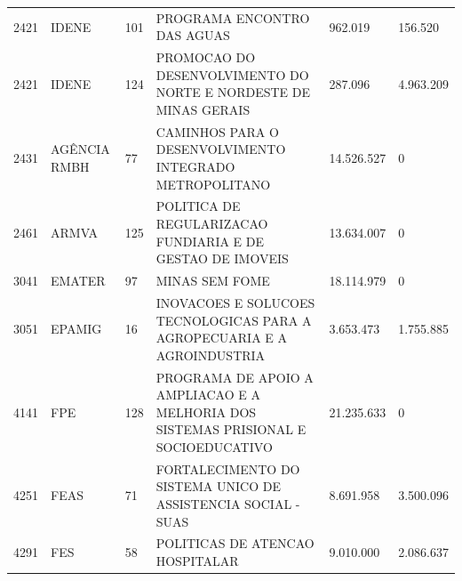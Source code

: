 \documentclass{article}
\begin{document}
\begin{longtable}[c]{m{1cm}|m{1.5cm}|m{1cm}m{8cm}|m{2cm}m{2cm}}
\multicolumn{1}{C{1cm}|}{2421} & \multicolumn{1}{L{1.5cm}|}{IDENE} & \multicolumn{1}{C{1cm}|}{101} & \multicolumn{1}{L{8cm}|}{PROGRAMA ENCONTRO DAS AGUAS} & \multicolumn{1}{R{2cm}|}{962.019} & \multicolumn{1}{R{2cm}}{156.520} \\
\multicolumn{1}{C{1cm}|}{2421} & \multicolumn{1}{L{1.5cm}|}{IDENE} & \multicolumn{1}{C{1cm}|}{124} & \multicolumn{1}{L{8cm}|}{PROMOCAO DO DESENVOLVIMENTO DO NORTE E NORDESTE DE MINAS GERAIS} & \multicolumn{1}{R{2cm}|}{287.096} & \multicolumn{1}{R{2cm}}{4.963.209} \\
\multicolumn{1}{C{1cm}|}{2431} & \multicolumn{1}{L{1.5cm}|}{AGÊNCIA RMBH} & \multicolumn{1}{C{1cm}|}{77} & \multicolumn{1}{L{8cm}|}{CAMINHOS PARA O DESENVOLVIMENTO INTEGRADO METROPOLITANO} & \multicolumn{1}{R{2cm}|}{14.526.527} & \multicolumn{1}{R{2cm}}{            0} \\
\multicolumn{1}{C{1cm}|}{2461} & \multicolumn{1}{L{1.5cm}|}{ARMVA} & \multicolumn{1}{C{1cm}|}{125} & \multicolumn{1}{L{8cm}|}{POLITICA DE REGULARIZACAO FUNDIARIA E DE GESTAO DE IMOVEIS} & \multicolumn{1}{R{2cm}|}{13.634.007} & \multicolumn{1}{R{2cm}}{            0} \\
\multicolumn{1}{C{1cm}|}{3041} & \multicolumn{1}{L{1.5cm}|}{EMATER} & \multicolumn{1}{C{1cm}|}{97} & \multicolumn{1}{L{8cm}|}{MINAS SEM FOME} & \multicolumn{1}{R{2cm}|}{18.114.979} & \multicolumn{1}{R{2cm}}{            0} \\
\multicolumn{1}{C{1cm}|}{3051} & \multicolumn{1}{L{1.5cm}|}{EPAMIG} & \multicolumn{1}{C{1cm}|}{16} & \multicolumn{1}{L{8cm}|}{INOVACOES E SOLUCOES TECNOLOGICAS PARA A AGROPECUARIA E A AGROINDUSTRIA} & \multicolumn{1}{R{2cm}|}{3.653.473} & \multicolumn{1}{R{2cm}}{1.755.885} \\
\multicolumn{1}{C{1cm}|}{4141} & \multicolumn{1}{L{1.5cm}|}{FPE} & \multicolumn{1}{C{1cm}|}{128} & \multicolumn{1}{L{8cm}|}{PROGRAMA DE APOIO A AMPLIACAO E A MELHORIA DOS SISTEMAS PRISIONAL E SOCIOEDUCATIVO} & \multicolumn{1}{R{2cm}|}{21.235.633} & \multicolumn{1}{R{2cm}}{            0} \\
\multicolumn{1}{C{1cm}|}{4251} & \multicolumn{1}{L{1.5cm}|}{FEAS} & \multicolumn{1}{C{1cm}|}{71} & \multicolumn{1}{L{8cm}|}{FORTALECIMENTO DO SISTEMA UNICO DE ASSISTENCIA SOCIAL - SUAS} & \multicolumn{1}{R{2cm}|}{8.691.958} & \multicolumn{1}{R{2cm}}{3.500.096} \\
\multicolumn{1}{C{1cm}|}{4291} & \multicolumn{1}{L{1.5cm}|}{FES} & \multicolumn{1}{C{1cm}|}{58} & \multicolumn{1}{L{8cm}|}{POLITICAS DE ATENCAO HOSPITALAR} & \multicolumn{1}{R{2cm}|}{9.010.000} & \multicolumn{1}{R{2cm}}{2.086.637} \\

\end{longtable}
\end{document}
